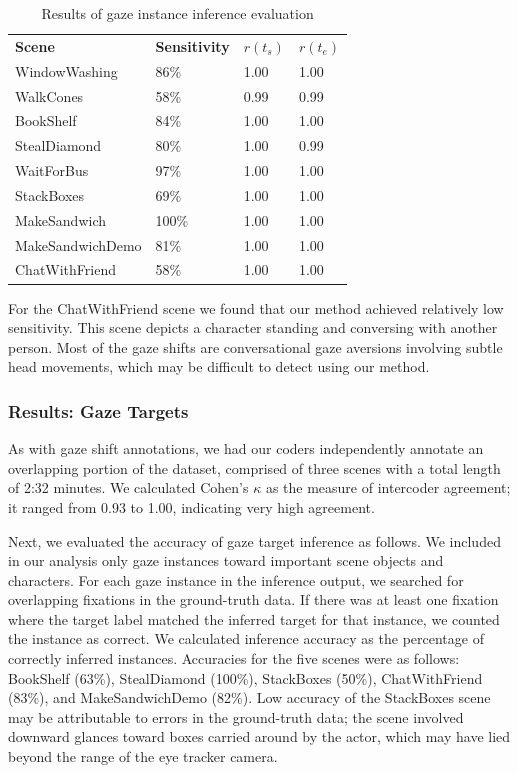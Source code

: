 \begin{table}
\centering
\def\arraystretch{1.5}
\begin{tabular}{|l||l|l|l|}
\hline
\textbf{Scene} & \textbf{Sensitivity} & $r(t_s)$ & $r(t_e)$ \\
\Xhline{2\arrayrulewidth}
WindowWashing & 86\% & 1.00 & 1.00 \\
WalkCones & 58\% & 0.99 & 0.99 \\
BookShelf & 84\% & 1.00 & 1.00 \\
StealDiamond & 80\% & 1.00 & 0.99 \\
WaitForBus & 97\% & 1.00 & 1.00 \\
StackBoxes & 69\% & 1.00 & 1.00 \\
MakeSandwich & 100\% & 1.00 & 1.00 \\
MakeSandwichDemo & 81\% & 1.00 & 1.00 \\
ChatWithFriend & 58\% & 1.00 & 1.00 \\
\hline
\end{tabular}
\caption{Results of gaze instance inference evaluation}
\label{tab:GazeShiftInferenceResults}
\end{table}

For the ChatWithFriend scene we found that our method achieved relatively low sensitivity. This scene depicts a character standing and conversing with another person. Most of the gaze shifts are conversational gaze aversions involving subtle head movements, which may be difficult to detect using our method.

\subsubsection{Results: Gaze Targets}

As with gaze shift annotations, we had our coders independently annotate an overlapping portion of the dataset, comprised of three scenes with a total length of 2:32 minutes. We calculated Cohen's $\kappa$ as the measure of intercoder agreement; it ranged from 0.93 to 1.00, indicating very high agreement.

Next, we evaluated the accuracy of gaze target inference as follows. We included in our analysis only gaze instances toward important scene objects and characters. For each gaze instance in the inference output, we searched for overlapping fixations in the ground-truth data. If there was at least one fixation where the target label matched the inferred target for that instance, we counted the instance as correct. We calculated inference accuracy as the percentage of correctly inferred instances. Accuracies for the five scenes were as follows: BookShelf (63\%), StealDiamond (100\%), StackBoxes (50\%), ChatWithFriend (83\%), and MakeSandwichDemo (82\%). Low accuracy of the StackBoxes scene may be attributable to errors in the ground-truth data; the scene involved downward glances toward boxes carried around by the actor, which may have lied beyond the range of the eye tracker camera.
